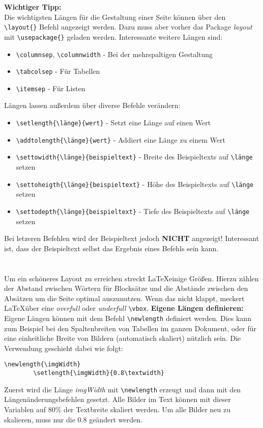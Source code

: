 \documentclass[10pt]{article}  %
\begin{document}
    \textbf{Wichtiger Tipp:}
    \\
    Die wichtigsten Längen für die Gestaltung einer Seite können über den \verb!\layout{}! Befehl angezeigt werden. Dazu muss aber vorher das Package \textsl{layout} mit \verb!\usepackage{}! geladen werden.
    Interessante weitere Längen sind:
    \begin{itemize}
        \item \verb!\columnsep!, \verb!\columnwidth! - Bei der mehrspaltigen Gestaltung
        \item \verb!\tabcolsep! - Für Tabellen
        \item \verb!\itemsep! - Für Listen
    \end{itemize}
    Längen lassen außerdem über diverse Befehle verändern:
    \begin{itemize}
        \item \verb!\setlength{\länge}{wert}! - Setzt eine Länge auf einen Wert
        \item \verb!\addtolength{\länge}{wert}! - Addiert eine Länge zu einem Wert
        \item \verb!\settowidth{\länge}{beispieltext}! - Breite des Beispieltexts auf \verb!\länge! setzen
        \item \verb!\settoheigth{\länge}{beispieltext}! - Höhe des Beispieltexts auf \verb!\länge! setzen
        \item \verb!\settodepth{\länge}{beispieltext}! - Tiefe des Beispieltexts auf \verb!\länge! setzen
    \end{itemize}
    Bei letzeren Befehlen wird der Beispieltext jedoch \textbf{NICHT} angezeigt! Interessant ist, dass der Beispieltext selbst das Ergebnis eines Befehls sein kann.
    \\
    \\
    \\
    Um ein schöneres Layout zu erreichen streckt \LaTeX \@ einige Größen. Hierzu zählen der Abstand zwischen Wörtern für Blocksätze und die Abstände zwischen den Absätzen um die Seite optimal auszunutzen. Wenn das nicht klappt, meckert \LaTeX \@ über eine \textsl{overfull} oder \textsl{underfull} \verb!\vbox!.
    \textbf{Eigene Längen definieren:}
    Eigene Längen können mit dem Befehl \verb!\newlength! definiert werden. Dies kann zum Beispiel bei den Spaltenbreiten von Tabellen im ganzen Dokument, oder für eine einheitliche Breite von Bildern (automatisch skaliert) nützlich sein.
    Die Verwendung geschieht dabei wie folgt:
    \lstset{language=TeX}
    \begin{lstlisting}[frame=single]
        \newlength{\imgWidth}
        \setlength{\imgWidth}{0.8\textwidth}
    \end{lstlisting}
    Zuerst wird die Länge \textsl{imgWidth} mit \verb!\newlength! erzeugt und dann mit den Längenänderungsbefehlen gesetzt.
    Alle Bilder im Text können mit dieser Variablen auf 80\% der Textbreite skaliert werden. Um alle Bilder neu zu skalieren, muss nur die 0.8 geändert werden.
\end{document}
